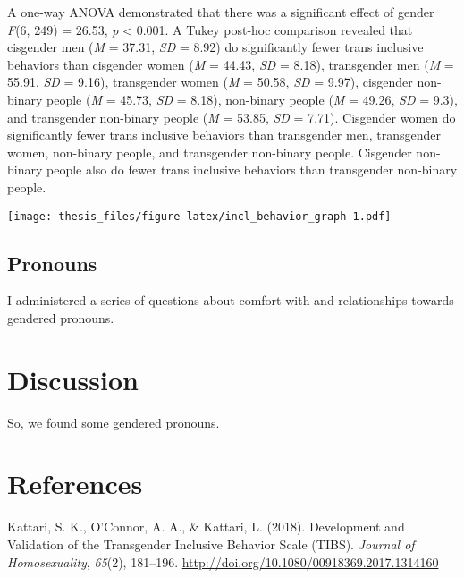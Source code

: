 \documentclass[12pt,twoside]{reedthesis}
\begin{document}
A one-way ANOVA demonstrated that there was a significant effect of gender \emph{F}(6, 249) = 26.53, \emph{p} \textless{} 0.001.
A Tukey post-hoc comparison revealed that cisgender men (\emph{M} = 37.31, \emph{SD} = 8.92) do significantly fewer trans inclusive behaviors than cisgender women (\emph{M} = 44.43, \emph{SD} = 8.18), transgender men (\emph{M} = 55.91, \emph{SD} = 9.16), transgender women (\emph{M} = 50.58, \emph{SD} = 9.97), cisgender non-binary people (\emph{M} = 45.73, \emph{SD} = 8.18), non-binary people (\emph{M} = 49.26, \emph{SD} = 9.3), and transgender non-binary people (\emph{M} = 53.85, \emph{SD} = 7.71). Cisgender women do significantly fewer trans inclusive behaviors than transgender men, transgender women, non-binary people, and transgender non-binary people. Cisgender non-binary people also do fewer trans inclusive behaviors than transgender non-binary people.

\texttt{[image: thesis\_files/figure-latex/incl\_behavior\_graph-1.pdf]}

\hypertarget{pronouns}{%
\section{Pronouns}\label{pronouns}}

I administered a series of questions about comfort with and relationships towards gendered pronouns.

\hypertarget{discussion}{%
\chapter{Discussion}\label{discussion}}

So, we found some gendered pronouns.

\appendix

\backmatter

\hypertarget{references}{%
\chapter*{References}\label{references}}


\noindent

\setlength{\parindent}{-0.20in}
\setlength{\leftskip}{0.20in}
\setlength{\parskip}{8pt}

\hypertarget{refs}{}
\leavevmode\hypertarget{ref-kattariDevelopmentValidationTransgender2018}{}%
Kattari, S. K., O'Connor, A. A., \& Kattari, L. (2018). Development and Validation of the Transgender Inclusive Behavior Scale (TIBS). \emph{Journal of Homosexuality}, \emph{65}(2), 181--196. \url{http://doi.org/10.1080/00918369.2017.1314160}
\end{document}
